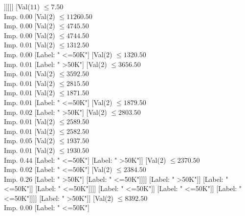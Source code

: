 \documentclass[margin=10pt]{standalone}
\begin{document}
\begin{forest}
							[Label: " >50K"]
							[Val($2$) $ \leq 15517.50$ \\ Imp. $0.01$
								[Label: " <=50K"]
								[Val($2$) $ \leq 15528.50$ \\ Imp. $0.11$
									[Label: " >50K"]
									[Label: " <=50K"]]]]]]
				[Val($11$) $ \leq 7.50$ \\ Imp. $0.00$
					[Val($2$) $ \leq 11260.50$ \\ Imp. $0.00$
						[Val($2$) $ \leq 4745.50$ \\ Imp. $0.00$
							[Val($2$) $ \leq 4744.50$ \\ Imp. $0.01$
								[Val($2$) $ \leq 1312.50$ \\ Imp. $0.00$
									[Label: " <=50K"]
									[Val($2$) $ \leq 1320.50$ \\ Imp. $0.01$
										[Label: " >50K"]
										[Val($2$) $ \leq 3656.50$ \\ Imp. $0.01$
											[Val($2$) $ \leq 3592.50$ \\ Imp. $0.01$
												[Val($2$) $ \leq 2815.50$ \\ Imp. $0.01$
													[Val($2$) $ \leq 1871.50$ \\ Imp. $0.01$
														[Label: " <=50K"]
														[Val($2$) $ \leq 1879.50$ \\ Imp. $0.02$
															[Label: " >50K"]
															[Val($2$) $ \leq 2803.50$ \\ Imp. $0.01$
																[Val($2$) $ \leq 2589.50$ \\ Imp. $0.01$
																	[Val($2$) $ \leq 2582.50$ \\ Imp. $0.05$
																		[Val($2$) $ \leq 1937.50$ \\ Imp. $0.01$
																			[Val($2$) $ \leq 1930.50$ \\ Imp. $0.44$
																				[Label: " <=50K"]
																				[Label: " >50K"]]
																			[Val($2$) $ \leq 2370.50$ \\ Imp. $0.02$
																				[Label: " <=50K"]
																				[Val($2$) $ \leq 2384.50$ \\ Imp. $0.26$
																					[Label: " >50K"]
																					[Label: " <=50K"]]]]
																		[Label: " >50K"]]
																	[Label: " <=50K"]]
																[Label: " <=50K"]]]]
													[Label: " <=50K"]]
												[Label: " <=50K"]]
											[Label: " <=50K"]]]]
								[Label: " >50K"]]
							[Val($2$) $ \leq 8392.50$ \\ Imp. $0.00$
								[Label: " <=50K"]

\end{forest}
\end{document}

